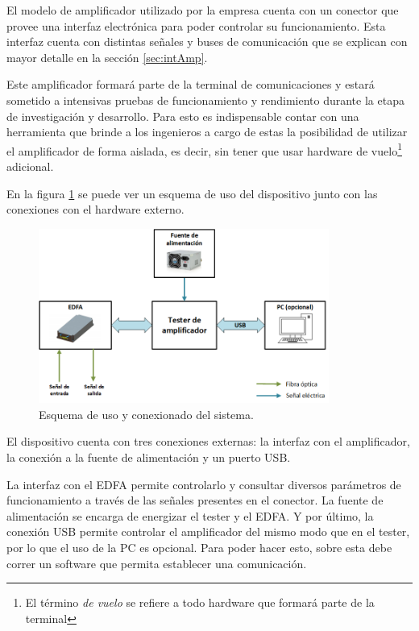 El modelo de amplificador utilizado por la empresa cuenta con un conector que provee una interfaz electrónica para poder controlar su funcionamiento. Esta interfaz cuenta con distintas señales y buses de comunicación que se explican con mayor detalle en la sección \ref{sec:intAmp}.

Este amplificador formará parte de la terminal de comunicaciones y estará sometido a intensivas pruebas de funcionamiento y rendimiento durante la etapa de investigación y desarrollo. Para esto es indispensable contar con una herramienta que brinde a los ingenieros a cargo de estas la posibilidad de utilizar el amplificador de forma aislada, es decir, sin tener que usar hardware de vuelo\footnote{El término \textit{de vuelo} se refiere a todo hardware que formará parte de la terminal} adicional.

En la figura \ref{fig:bloquesProy} se puede ver un esquema de uso del dispositivo junto con las conexiones con el hardware externo.

\begin{figure}[H]
\centering
\includegraphics[width=0.85\textwidth]{./Figures/bloquesProy.png}
\caption{Esquema de uso y conexionado del sistema.}
\label{fig:bloquesProy}
\end{figure}

El dispositivo cuenta con tres conexiones externas: la interfaz con el amplificador, la conexión a la fuente de alimentación y un puerto USB.

La interfaz con el EDFA permite controlarlo y consultar diversos parámetros de funcionamiento a través de las señales presentes en el conector. La fuente de alimentación se encarga de energizar el tester y el EDFA. Y por último, la conexión USB permite controlar el amplificador del mismo modo que en el tester, por lo que el uso de la PC es opcional. Para poder hacer esto, sobre esta debe correr un software que permita establecer una comunicación.

